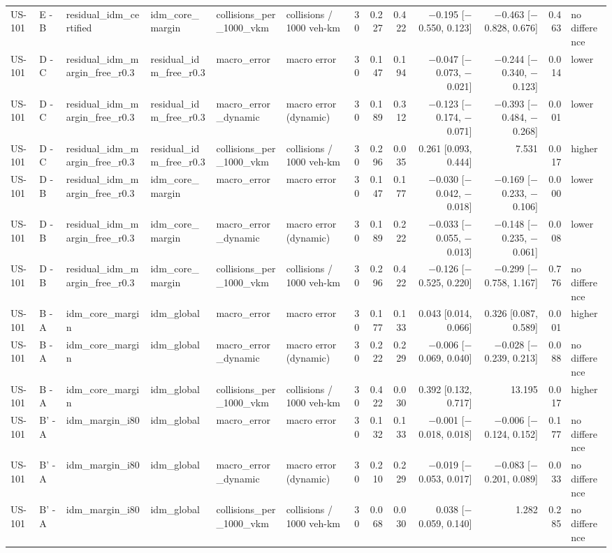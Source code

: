 \begin{table}[htbp]
{\begin{tabular}{llllllrrrrrrl}
US-101 & E - B & residual\_idm\_certified & idm\_core\_margin & collisions\_per\_1000\_vkm & collisions / 1000 veh-km & 30 & 0.227 & 0.422 & $-$0.195 [$-$0.550, 0.123] & $-$0.463 [$-$0.828, 0.676] & 0.463 & no difference \\
US-101 & D - C & residual\_idm\_margin\_free\_r0.3 & residual\_idm\_free\_r0.3 & macro\_error & macro error & 30 & 0.147 & 0.194 & $-$0.047 [$-$0.073, $-$0.021] & $-$0.244 [$-$0.340, $-$0.123] & 0.014 & lower \\
US-101 & D - C & residual\_idm\_margin\_free\_r0.3 & residual\_idm\_free\_r0.3 & macro\_error\_dynamic & macro error (dynamic) & 30 & 0.189 & 0.312 & $-$0.123 [$-$0.174, $-$0.071] & $-$0.393 [$-$0.484, $-$0.268] & 0.001 & lower \\
US-101 & D - C & residual\_idm\_margin\_free\_r0.3 & residual\_idm\_free\_r0.3 & collisions\_per\_1000\_vkm & collisions / 1000 veh-km & 30 & 0.296 & 0.035 & 0.261 [0.093, 0.444] & 7.531 & 0.017 & higher \\
US-101 & D - B & residual\_idm\_margin\_free\_r0.3 & idm\_core\_margin & macro\_error & macro error & 30 & 0.147 & 0.177 & $-$0.030 [$-$0.042, $-$0.018] & $-$0.169 [$-$0.233, $-$0.106] & 0.000 & lower \\
US-101 & D - B & residual\_idm\_margin\_free\_r0.3 & idm\_core\_margin & macro\_error\_dynamic & macro error (dynamic) & 30 & 0.189 & 0.222 & $-$0.033 [$-$0.055, $-$0.013] & $-$0.148 [$-$0.235, $-$0.061] & 0.008 & lower \\
US-101 & D - B & residual\_idm\_margin\_free\_r0.3 & idm\_core\_margin & collisions\_per\_1000\_vkm & collisions / 1000 veh-km & 30 & 0.296 & 0.422 & $-$0.126 [$-$0.525, 0.220] & $-$0.299 [$-$0.758, 1.167] & 0.776 & no difference \\
US-101 & B - A & idm\_core\_margin & idm\_global & macro\_error & macro error & 30 & 0.177 & 0.133 & 0.043 [0.014, 0.066] & 0.326 [0.087, 0.589] & 0.001 & higher \\
US-101 & B - A & idm\_core\_margin & idm\_global & macro\_error\_dynamic & macro error (dynamic) & 30 & 0.222 & 0.229 & $-$0.006 [$-$0.069, 0.040] & $-$0.028 [$-$0.239, 0.213] & 0.088 & no difference \\
US-101 & B - A & idm\_core\_margin & idm\_global & collisions\_per\_1000\_vkm & collisions / 1000 veh-km & 30 & 0.422 & 0.030 & 0.392 [0.132, 0.717] & 13.195 & 0.017 & higher \\
US-101 & B' - A & idm\_margin\_i80 & idm\_global & macro\_error & macro error & 30 & 0.132 & 0.133 & $-$0.001 [$-$0.018, 0.018] & $-$0.006 [$-$0.124, 0.152] & 0.177 & no difference \\
US-101 & B' - A & idm\_margin\_i80 & idm\_global & macro\_error\_dynamic & macro error (dynamic) & 30 & 0.210 & 0.229 & $-$0.019 [$-$0.053, 0.017] & $-$0.083 [$-$0.201, 0.089] & 0.033 & no difference \\
US-101 & B' - A & idm\_margin\_i80 & idm\_global & collisions\_per\_1000\_vkm & collisions / 1000 veh-km & 30 & 0.068 & 0.030 & 0.038 [$-$0.059, 0.140] & 1.282 & 0.285 & no difference \\
\bottomrule
\end{tabular}
}
\end{table}

